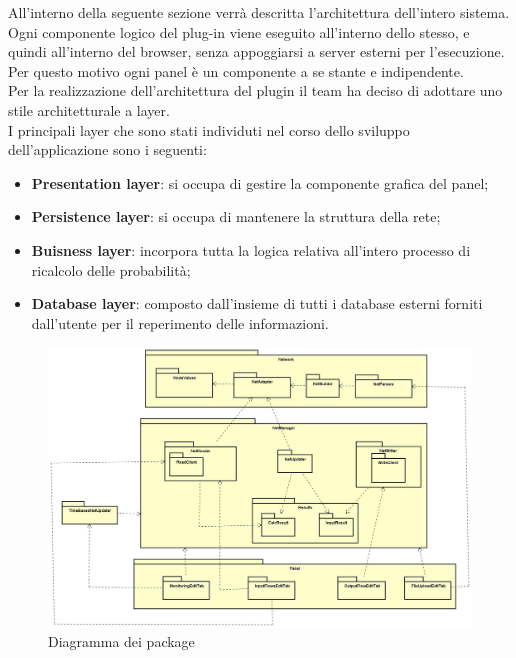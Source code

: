 \pagebreak
{}
All'interno della seguente sezione verrà descritta l'architettura dell'intero sistema.\\
Ogni componente logico del plug-in viene eseguito all'interno dello stesso, e quindi all'interno del browser, senza appoggiarsi a server esterni per l'esecuzione. Per questo motivo ogni panel è un componente a se stante e indipendente. \\
Per la realizzazione dell'architettura del plugin il team ha deciso di adottare uno stile architetturale a layer.\\
I principali layer che sono stati individuti nel corso dello sviluppo dell'applicazione sono i seguenti:
\begin{itemize}
	\item{\textbf{Presentation layer}: si occupa di gestire la componente grafica del panel;}
	\item{\textbf{Persistence layer}: si occupa di mantenere la struttura della rete;}
	\item{\textbf{Buisness layer}: incorpora tutta la logica relativa all’intero processo di ricalcolo delle probabilità;}
	\item{\textbf{Database layer}: composto dall’insieme di tutti i database esterni forniti dall’utente per il reperimento delle informazioni.}
\end{itemize}
\begin{figure} [H]
	\centering
	\includegraphics[scale=0.25]{Img/Diagramma_Package}
	\caption{Diagramma dei package}\label{}
\end{figure}
